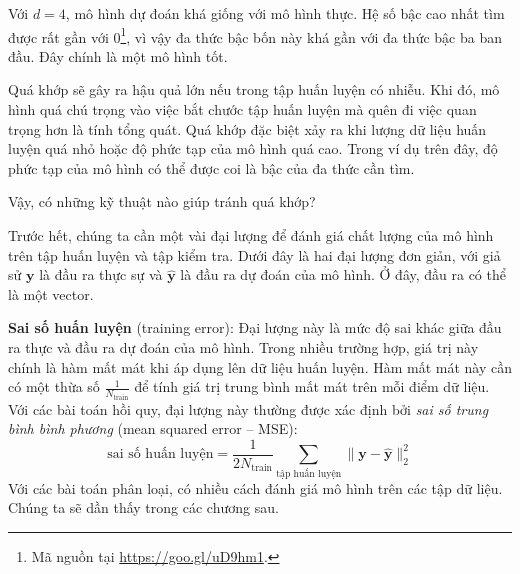 
Với $d = 4$, mô hình dự đoán khá giống với mô hình thực. Hệ số bậc cao nhất tìm
được rất gần với 0\footnote{Mã nguồn tại \url{https://goo.gl/uD9hm1}.}, vì
vậy đa thức bậc bốn này khá gần với đa thức bậc ba ban đầu. Đây chính là một mô
hình tốt.


Quá khớp sẽ gây ra hậu quả lớn nếu trong tập huấn luyện có nhiễu. Khi
đó, mô hình quá chú trọng vào việc bắt chước tập huấn luyện mà quên đi việc
quan trọng hơn là tính tổng quát. Quá khớp đặc biệt xảy ra khi lượng dữ liệu huấn
luyện quá nhỏ hoặc độ phức tạp của mô hình quá cao. Trong ví dụ trên đây, độ
phức tạp của mô hình có thể được coi là bậc của đa thức cần tìm.


Vậy, có những kỹ thuật nào giúp tránh quá khớp?

Trước hết, chúng ta cần một vài đại lượng để đánh giá chất lượng của mô hình
trên tập huấn luyện và tập kiểm tra. Dưới đây là hai đại lượng đơn giản, với
giả sử $\mathbf{y}$ là đầu ra thực sự và $\mathbf{\hat{y}}$ là đầu ra dự đoán
của mô hình. Ở đây, đầu ra có thể là một vector.

\textbf{Sai số huấn luyện} (training error): Đại lượng này là mức độ sai khác giữa đầu ra thực và đầu
ra dự đoán của mô hình. Trong nhiều trường hợp, giá trị này chính là hàm mất mát khi áp dụng lên dữ liệu huấn luyện. Hàm mất mát này cần có một thừa số $\displaystyle
\frac{1}{N_{\text{train}}}$ để tính giá trị trung bình mất mát
trên mỗi điểm dữ liệu. Với các bài toán hồi quy, đại lượng này thường được xác định bởi \textit{sai số trung bình bình phương} ({mean squared error -- MSE}):
\begin{equation*}
\text{sai số huấn luyện}= \frac{1}{2N_{\text{train}}} \sum_{\text{tập huấn luyện}}
\|\mathbf{y} - \mathbf{\hat{y}}\|_2^2
\end{equation*}
Với các bài toán phân loại, có nhiều cách đánh giá mô hình trên các tập dữ liệu. Chúng ta sẽ dần thấy trong các chương sau.

